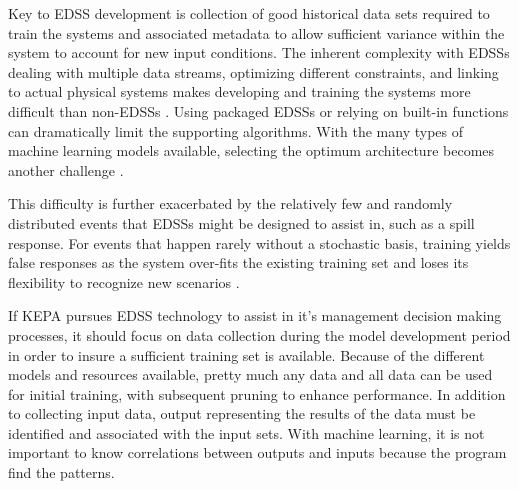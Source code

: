 Key to EDSS development is collection of good historical data sets required to train the systems and associated metadata to allow sufficient variance within the system to account for new input conditions. The inherent complexity with EDSSs dealing with multiple data streams, optimizing different constraints, and linking to actual physical systems makes developing and training the systems more difficult than non-EDSSs \citep{Swayne2000}. Using packaged EDSSs or relying on built-in functions can dramatically limit the supporting algorithms. With the many types of machine learning models available, selecting the optimum architecture becomes another challenge \citep{Massei2014}.

This difficulty is further exacerbated by the relatively few and randomly distributed events that EDSSs might be designed to assist in, such as a spill response. For events that happen rarely without a stochastic basis, training yields false responses as the system over-fits the existing training set and loses its flexibility to recognize new scenarios \citep{Goodfellow2016}.

If KEPA pursues EDSS technology to assist in it's management decision making processes, it should focus on data collection during the model development period in order to insure a sufficient training set is available. Because of the different models and resources available, pretty much any data and all data can be used for initial training, with subsequent pruning to enhance performance. In addition to collecting input data, output representing the results of the data must be identified and associated with the input sets. With machine learning, it is not important to know correlations between outputs and inputs because the program find the patterns.
